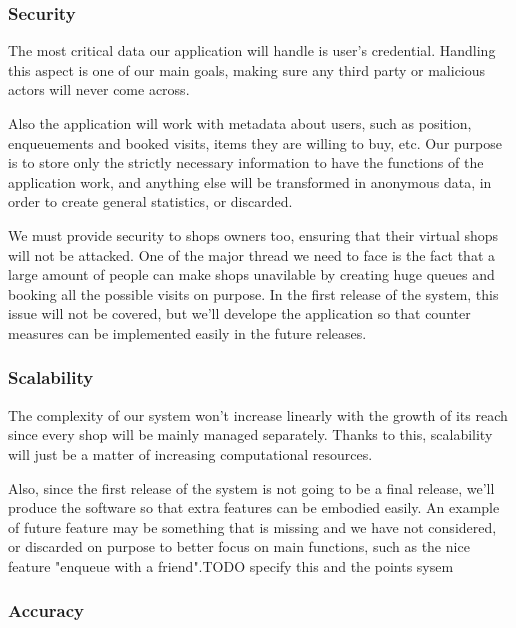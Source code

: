 \subsubsection{Security}
\label{subsubsect:security}

The most critical data our application will handle is user's credential. Handling this aspect is one of our main goals, making sure any third party or malicious actors will never come across. 

Also the application will work with metadata about users, such as position, enqueuements and booked visits, items they are willing to buy, etc. Our purpose is to store only the strictly necessary information to have the functions of the application work, and anything else will be transformed in anonymous data, in order to create general statistics, or discarded.

We must provide security to shops owners too, ensuring that their virtual shops will not be attacked. One of the major thread we need to face is the fact that a large amount of people can make shops unavilable by creating huge queues and booking all the possible visits on purpose. In the first release of the system, this issue will not be covered, but we'll develope the application so that counter measures can be implemented easily in the future releases.

\subsubsection{Scalability}
\label{subsubsect:scalability}

The complexity of our system won't increase linearly with the growth of its reach since every shop will be mainly managed separately.
Thanks to this, scalability will just be a matter of increasing computational resources. 

Also, since the first release of the system is not going to be a final release, we'll produce the software so that extra features can be embodied easily. An example of future feature may be something that is missing and we have not considered, or discarded on purpose to better focus on main functions, such as the nice feature "enqueue with a friend".TODO specify this and the points sysem

\subsubsection{Accuracy}
\label{subsubsect:accuracy}

